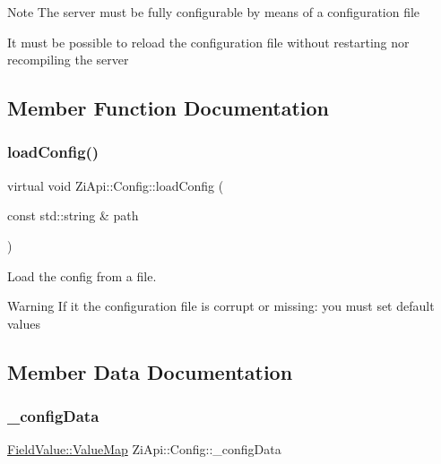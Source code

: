 \begin{DoxyNote}{Note}
The server must be fully configurable by means of a configuration file 

It must be possible to reload the configuration file without restarting nor recompiling the server 
\end{DoxyNote}


\subsection{Member Function Documentation}
\mbox{\label{classZiApi_1_1Config_adea7c918bc9802e935a76bc525d5c898}} 
\subsubsection{\texorpdfstring{loadConfig()}{loadConfig()}}
{\footnotesize\ttfamily virtual void Zi\+Api\+::\+Config\+::load\+Config (\begin{DoxyParamCaption}\item[{const std\+::string \&}]{path }\end{DoxyParamCaption})\hspace{0.3cm}{\ttfamily [pure virtual]}}



Load the config from a file. 

\begin{DoxyWarning}{Warning}
If it the configuration file is corrupt or missing\+: you must set default values 
\end{DoxyWarning}


\subsection{Member Data Documentation}
\mbox{\label{classZiApi_1_1Config_abd7591f92a4590b36e93e0a5ada2373c}} 
\subsubsection{\texorpdfstring{\_configData}{\_configData}}
{\footnotesize\ttfamily \mbox{\hyperlink{classZiApi_1_1FieldValue_ad8dd32464e75289185e2d8260cb3672d}{Field\+Value\+::\+Value\+Map}} Zi\+Api\+::\+Config\+::\+\_\+config\+Data\hspace{0.3cm}{\ttfamily [protected]}}



